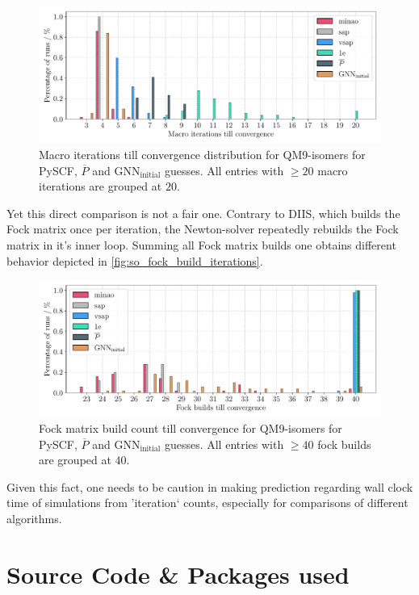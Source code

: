 \begin{figure}[H]
    \centering
    \includegraphics[width=\textwidth]{../fig/gnn/SO_0D_GNN_model_iteration_count_bar.pdf}
    \caption[Macro iterations till convergence distribution for QM9-isomers]{Macro iterations till convergence distribution for QM9-isomers for PySCF, $\overline{P}$ and GNN$_\text{initial}$ guesses. All entries with $\geq 20$ macro iterations are grouped at $20$.}
    \label{fig:so_macro_iterations}
\end{figure}
Yet this direct comparison is not a fair one. Contrary to DIIS, which builds the Fock matrix once per iteration, the Newton-solver repeatedly rebuilds the Fock matrix in it's inner loop. Summing all Fock matrix builds one obtains different behavior depicted in \autoref{fig:so_fock_build_iterations}.  
\begin{figure}[H]
    \centering
    \includegraphics[width=\textwidth]{../fig/gnn/SO_0D_GNN_model_fock_build_count_bar.pdf}
    \caption[Fock matrix build count till convergence QM9-isomers]{Fock matrix build count till convergence for QM9-isomers for PySCF, $\overline{P}$ and GNN$_\text{initial}$ guesses. All entries with $\geq 40$ fock builds are grouped at $40$.}
    \label{fig:so_fock_build_iterations}
\end{figure}
Given this fact, one needs to be caution in making prediction regarding wall clock time of simulations from 'iteration` counts, especially for comparisons of different algorithms.

\section{Source Code \& Packages used}
\label{sec:source_code_packages}
